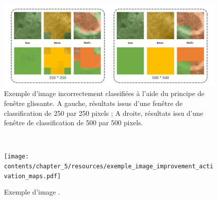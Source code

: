 \begin{figure}[H]
    \centering
    \includegraphics[width=\linewidth]{contents/chapter_5/resources/exemple_image_improvement_well.pdf}
    \caption{Exemple d'image incorrectement classifiées à l'aide du principe de fenêtre glissante. A gauche, résultats issus d'une fenêtre de classification de 250 par 250 pixels ; A droite, résultats issu d'une fenêtre de classification de 500 par 500 pixels.}
    \label{fig:exemple_image_improvement_misclassified}
\end{figure}\par


~\cite{jia2017}
\begin{figure}[H]
    \centering
    \texttt{[image: contents/chapter\_5/resources/exemple\_image\_improvement\_activation\_maps.pdf]}
    \caption{Exemple d'image .}
    \label{fig:exemple_image_improvement_activation_maps}
\end{figure}\par